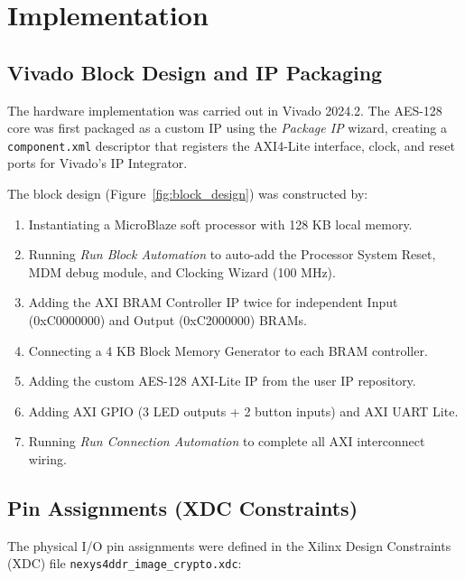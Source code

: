 
\section{Implementation}

\subsection{Vivado Block Design and IP Packaging}

The hardware implementation was carried out in Vivado 2024.2. The AES-128 core was first packaged as a custom IP using the \textit{Package IP} wizard, creating a \texttt{component.xml} descriptor that registers the AXI4-Lite interface, clock, and reset ports for Vivado's IP Integrator.

The block design (Figure~\ref{fig:block_design}) was constructed by:
\begin{enumerate}[leftmargin=*]
    \item Instantiating a MicroBlaze soft processor with 128 KB local memory.
    \item Running \textit{Run Block Automation} to auto-add the Processor System Reset, MDM debug module, and Clocking Wizard (100 MHz).
    \item Adding the AXI BRAM Controller IP twice for independent Input (0xC0000000) and Output (0xC2000000) BRAMs.
    \item Connecting a 4 KB Block Memory Generator to each BRAM controller.
    \item Adding the custom AES-128 AXI-Lite IP from the user IP repository.
    \item Adding AXI GPIO (3 LED outputs + 2 button inputs) and AXI UART Lite.
    \item Running \textit{Run Connection Automation} to complete all AXI interconnect wiring.
\end{enumerate}

\subsection{Pin Assignments (XDC Constraints)}

The physical I/O pin assignments were defined in the Xilinx Design Constraints (XDC) file \texttt{nexys4ddr\_image\_crypto.xdc}:

